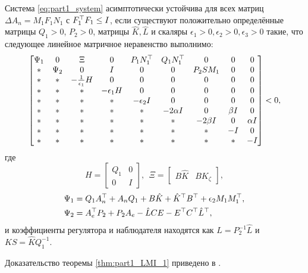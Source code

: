 \begin{theorem}\label{thm:part1_LMI_1}
	Система \eqref{eq:part1_system} асимптотически устойчива для всех матриц $\Delta {A}_n={M}_1{F}_1{N}_1$ с ${F}_1^\top{F}_1\leq {I}$, если существуют положительно определённые матрицы ${Q}_1>0$, ${P}_2>0$, матрицы $\hat{{K}}, \hat{{L}}$ и скаляры $\epsilon_1>0, \epsilon_2>0, \epsilon_3>0$ такие, что следующее линейное матричное неравенство выполнимо: 
	\begin{equation}
		\label{eq:thm1_final_LMI_ab}
		\begin{bmatrix}    
			{\Psi}_1  & 0 & {\Xi} & 0 &  {P}_1{N}_1^\top & {Q}_1{N}_1^\top & 0 & 0 & 0\\
			* & {\Psi}_2 & 0 & {I} & 0 & 0 & {P}_2{S}{M}_1 & 0 & 0\\
			* & * &  -\frac{1}{\epsilon_1}{H} & 0 & 0 &0 & 0& 0 & 0\\
			* & * & * & -\epsilon_1{H} & 0 & 0 & 0 & 0 & 0 \\
			* & * & * & * & -\epsilon_2 {I} & 0 & 0 & 0 & 0 \\      
			* & * & * & * & *&  -2\alpha {I} & 0 & \beta {I} &0 \\
			* & * & * & * & *& * & -2\beta {I} & 0 & \alpha {I} \\
			* & * & * & * & *&*&* &-{I}&0\\
			* & * & * & * & *&*&*&* &-{I}
		\end{bmatrix} <0,
	\end{equation}
	где
	\begin{equation}
		\label{eq:H_Xi_variables}
		{H} = \begin{bmatrix}
			{Q}_1 & 0 \\
			0 & {I}
		\end{bmatrix}, \ \ 
		{\Xi} = \begin{bmatrix}
			{B}\hat{{K}} & {B}{K}_{\zeta} \end{bmatrix},
	\end{equation}
	\begin{align}
		\label{eq:Psi_1}
		{\Psi}_1&={Q}_1{A}_n^\top+{A}_n{Q}_1+{B}\hat{{K}}+\hat{{K}}^\top{B}^\top  +\epsilon_2{M}_1{M}_1^\top, \\
		\label{eq:Psi_2}
		{\Psi}_2 &={A}_e^\top{P}_2+{P}_2{A}_e-\hat{{L}}{CE}-{E}^\top{C}^\top\hat{{L}}^\top,
	\end{align}
	и коэффициенты регулятора и наблюдателя находятся как ${L}={P}^{-1}_2\hat{{L}}$
	и ${KS}=\hat{{K}}{Q}^{-1}_1$.  
\end{theorem}

Доказательство теоремы \ref{thm:part1_LMI_1} приведено в \cite{scbib1}.

